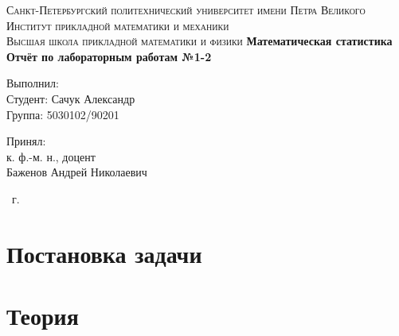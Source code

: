 \documentclass[14pt,a4paper,article]{ncc}
\begin{document}
\begin{titlepage}
    \begin{center}
        \textsc{
            Санкт-Петербургский политехнический университет имени Петра Великого \\[5mm]
            Институт прикладной математики и механики\\[2mm]
            Высшая школа прикладной математики и физики            
        }   
        \vfill
        \textbf{\large
            Математическая статистика\\
            Отчёт по лабораторным работам №1-2 \\[3mm]
        }                
    \end{center}

    \vfill
    \hfill
    \begin{minipage}{0.5\textwidth}
        Выполнил: \\[2mm]   
		Студент: Сачук Александр \\
		Группа: 5030102/90201\\
    \end{minipage}

	\hfill
	\begin{minipage}{0.5\textwidth}
		Принял: \\[2mm]
		к. ф.-м. н., доцент \\   
		Баженов Андрей Николаевич
	\end{minipage}

    \vfill
    \begin{center}
        \theyear\ г.
    \end{center}
\end{titlepage}

\tableofcontents
\newpage
\listoffigures
\newpage
\listoftables
\newpage

\section{Постановка задачи}

\begin{enumerate}




\end{enumerate}
\newpage

\section{Теория}





\newpage
\end{document}
